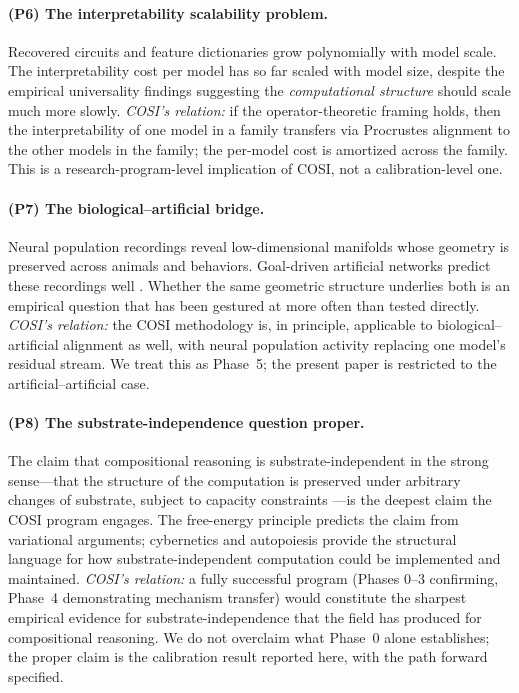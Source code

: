 \paragraph{(P6) The interpretability scalability problem.}
Recovered circuits and feature dictionaries grow polynomially with
model scale. The interpretability cost per model has so far scaled with
model size, despite the empirical universality findings suggesting the
\emph{computational structure} should scale much more slowly.
\emph{COSI's relation:} if the operator-theoretic framing holds, then
the interpretability of one model in a family transfers via Procrustes
alignment to the other models in the family; the per-model cost is
amortized across the family. This is a research-program-level
implication of COSI, not a calibration-level one.

\paragraph{(P7) The biological--artificial bridge.}
Neural population recordings reveal low-dimensional manifolds
\cite{gallego2017neural, saxena2019towards} whose geometry is preserved
across animals and behaviors. Goal-driven artificial networks predict
these recordings well \cite{yamins2016using}. Whether the same
geometric structure underlies both is an empirical question that has
been gestured at more often than tested directly. \emph{COSI's
relation:} the COSI methodology is, in principle, applicable to
biological--artificial alignment as well, with neural population
activity replacing one model's residual stream. We treat this as
Phase~5; the present paper is restricted to the artificial--artificial
case.

\paragraph{(P8) The substrate-independence question proper.}
The claim that compositional reasoning is substrate-independent in the
strong sense---that the structure of the computation is preserved
under arbitrary changes of substrate, subject to capacity constraints
\cite{ashby1956introduction}---is the deepest claim the COSI program
engages. The free-energy principle \cite{friston2010free} predicts the
claim from variational arguments; cybernetics
\cite{wiener1948cybernetics} and autopoiesis
\cite{maturana1980autopoiesis} provide the structural language for
how substrate-independent computation could be implemented and
maintained. \emph{COSI's relation:} a fully successful program (Phases
0--3 confirming, Phase~4 demonstrating mechanism transfer) would
constitute the sharpest empirical evidence for substrate-independence
that the field has produced for compositional reasoning. We do not
overclaim what Phase~0 alone establishes; the proper claim is the
calibration result reported here, with the path forward specified.

